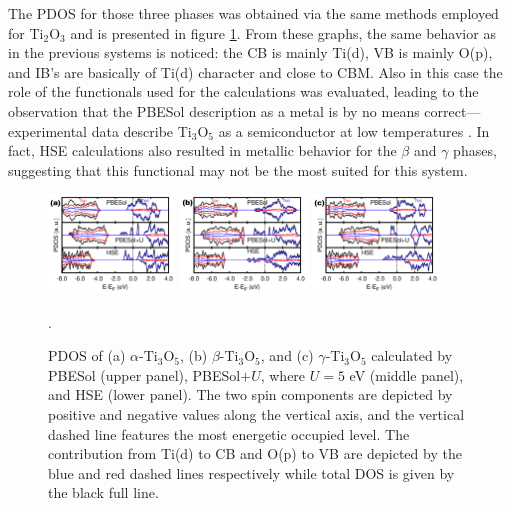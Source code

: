 The PDOS for those three phases was obtained via the same methods employed for Ti$_2$O$_3$ and is presented in figure \ref{fig:dos-ti3o5-prb}. From these graphs, the same behavior as in the previous systems is noticed: the CB is mainly Ti(d), VB is mainly O(p), and IB's are basically of Ti(d) character and close to CBM. Also in this case the role of the functionals used for the calculations was evaluated, leading to the observation that the PBESol description as a metal is by no means correct---experimental data describe Ti$_3$O$_5$ as a semiconductor at low temperatures \cite{Rao1971,Bartholomew1969}. In fact, HSE calculations also resulted in metallic behavior for the $\beta$ and $\gamma$ phases, suggesting that this functional may not be the most suited for this system.
\begin{center}
  \begin{figure}[ht!]
      \begin{center}
        \includegraphics[width=0.3\textwidth]{img/dos-alpha-ti3o5.jpg}
        \includegraphics[width=0.3\textwidth]{img/dos-beta-ti3o5.jpg}
        \includegraphics[width=0.3\textwidth]{img/dos-gamma-ti3o5.jpg} 
      \end{center}
      \caption{PDOS of (a) $\alpha$-Ti$_3$O$_5$, (b) $\beta$-Ti$_3$O$_5$, and (c) $\gamma$-Ti$_3$O$_5$ calculated by PBESol (upper panel), PBESol$+U$, where $U = 5$ eV (middle panel), and HSE (lower panel). The two spin components are depicted by positive and negative values along the vertical axis, and the vertical dashed line features the most energetic occupied level. The contribution from Ti(d) to CB and O(p) to VB are depicted by the blue and red dashed lines respectively while total DOS is given by the black full line.}.
      \label{fig:dos-ti3o5-prb} 
  \end{figure}
\end{center}

